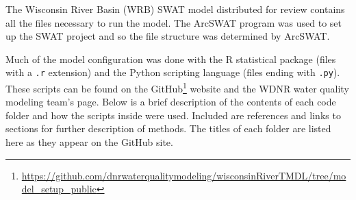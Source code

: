 \label{sec:model_data}
The Wisconsin River Basin (WRB) SWAT model distributed for review contains all the files necessary to run the model. The ArcSWAT program was used to set up the SWAT project and so the file structure was determined by ArcSWAT. 

Much of the model configuration was done with the R statistical package (files with a \texttt{.r} extension) and the Python scripting language (files ending with \texttt{.py}). These scripts can be found on the GitHub\footnote{\url{https://github.com/dnrwaterqualitymodeling/wisconsinRiverTMDL/tree/model_setup_public}} website and the WDNR water quality modeling team's page. Below is a brief description of the contents of each code folder and how the scripts inside were used. Included are references and links to sections for further description of methods. The titles of each folder are listed here as they appear on the GitHub site.

